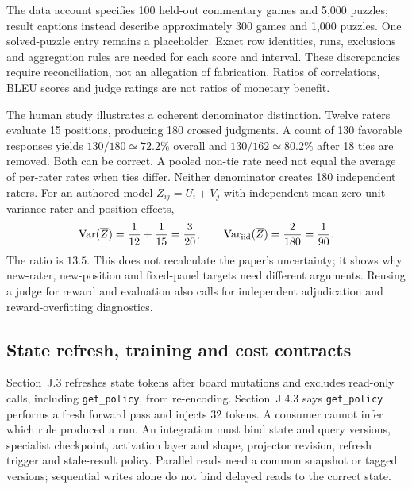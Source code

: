The data account specifies 100 held-out commentary games and 5,000 puzzles; result captions instead describe approximately 300 games and 1,000 puzzles. One solved-puzzle entry remains a placeholder. Exact row identities, runs, exclusions and aggregation rules are needed for each score and interval. These discrepancies require reconciliation, not an allegation of fabrication. Ratios of correlations, BLEU scores and judge ratings are not ratios of monetary benefit.\citep{exec24_collaboration_original}

The human study illustrates a coherent denominator distinction. Twelve raters evaluate 15 positions, producing 180 crossed judgments. A count of 130 favorable responses yields $130/180\simeq72.2\%$ overall and $130/162\simeq80.2\%$ after 18 ties are removed. Both can be correct. A pooled non-tie rate need not equal the average of per-rater rates when ties differ. Neither denominator creates 180 independent raters. For an authored model $Z_{ij}=U_i+V_j$ with independent mean-zero unit-variance rater and position effects,
\begin{equation}
 \operatorname{Var}(\overline Z)=\frac1{12}+\frac1{15}=\frac3{20},\qquad
 \operatorname{Var}_{\rm iid}(\overline Z)=\frac2{180}=\frac1{90}.
 \label{eq:exec24-collaboration-crossed}
\end{equation}
The ratio is $13.5$. This does not recalculate the paper's uncertainty; it shows why new-rater, new-position and fixed-panel targets need different arguments. Reusing a judge for reward and evaluation also calls for independent adjudication and reward-overfitting diagnostics.\citep{exec24_collaboration_original,exec24_collaboration_reference}

\subsection{State refresh, training and cost contracts}
Section~J.3 refreshes state tokens after board mutations and excludes read-only calls, including \texttt{get\_policy}, from re-encoding. Section~J.4.3 says \texttt{get\_policy} performs a fresh forward pass and injects 32 tokens. A consumer cannot infer which rule produced a run. An integration must bind state and query versions, specialist checkpoint, activation layer and shape, projector revision, refresh trigger and stale-result policy. Parallel reads need a common snapshot or tagged versions; sequential writes alone do not bind delayed reads to the correct state.\citep{exec24_collaboration_original}

